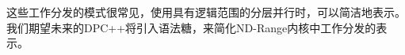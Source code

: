 这些工作分发的模式很常见，使用具有逻辑范围的分层并行时，可以简洁地表示。我们期望未来的DPC++将引入语法糖，来简化ND-Range内核中工作分发的表示。\par


































